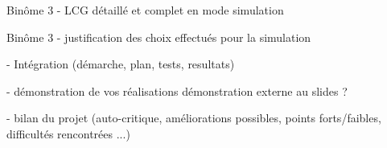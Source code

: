 \documentclass{beamer}
\begin{document}
\begin{frame}
Binôme 3
- LCG détaillé et complet en mode simulation
\end{frame}

\begin{frame}
Binôme 3
- justification des choix effectués pour la simulation 
\end{frame}

\begin{frame}
- Intégration (démarche, plan, tests, resultats)
\end{frame}

\begin{frame}
- démonstration de vos réalisations
démonstration externe au slides ?
\end{frame}

\begin{frame}
- bilan du projet (auto-critique, améliorations possibles, points forts/faibles, difficultés rencontrées ...) 
\end{frame}
\end{document}
